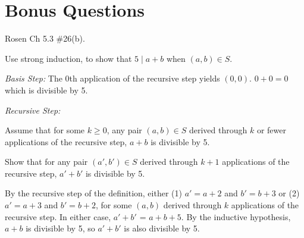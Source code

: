 \begin{questions}
\begin{solution}
    \end{solution}




\section*{Bonus Questions} 


\bonusquestion[4] Rosen Ch 5.3 \#26(b). 

\begin{solution}
Use strong induction, to show that $5\;|\; a+b$ when $(a,b) \in S$.  

\textit{Basis Step:}  The 0th application of the recursive step yields $(0,0)$.  $0 + 0 = 0$ which is divisible by 5. 

\smallskip
\textit{Recursive Step:} 

Assume that for some $k \geq 0$, any pair $(a,b) \in S$ derived through $k$ or fewer applications of the recursive step, $a + b$ is divisible by 5. 

Show that for any pair $(a' , b' ) \in S$ derived through $k + 1$ applications of the recursive step, $a' + b'$ is divisible by 5. 

By the recursive step of the definition, either (1) $a' = a+2$ and $b' = b+3$ or (2) $a' = a+3$ and $b' = b+2$, for some $(a, b)$ derived through $k$ applications of the recursive step. In either case, $a' + b'$ = $a + b + 5$.  By the inductive hypothesis, $a + b$ is divisible by 5, so $a' + b'$ is also divisible by 5.


\end{solution}
\end{questions}

